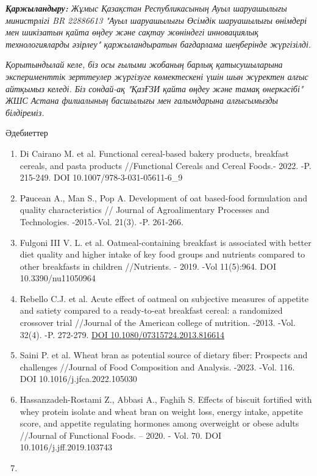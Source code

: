 \emph{{\bfseries Қаржыландыру:} Жұмыс Қазақстан Республикасының Ауыл
шаруашылығы министрлігі BR 22886613 "Ауыл шаруашылығы Өсімдік
шаруашылығы өнімдері мен шикізатын қайта өңдеу және сақтау жөніндегі
инновациялық технологияларды әзірлеу" қаржыландыратын бағдарлама
шеңберінде жүргізілді.}

\emph{Қорытындылай келе, біз осы ғылыми жобаның барлық қатысушыларына
эксперименттік зерттеулер жүргізуге көмектескені үшін шын жүректен алғыс
айтқымыз келеді. Біз сондай-ақ "ҚазҒЗИ қайта өңдеу және тамақ
өнеркәсібі" ЖШС Астана филиалының басшылығы мен ғалымдарына алғысымызды
білдіреміз.}

Әдебиеттер

\begin{enumerate}
\def\labelenumi{\arabic{enumi}.}
\item
  Di Cairano M. et al. Functional cereal-based bakery products,
  breakfast cereals, and pasta products //Functional Cereals and Cereal
  Foods.- 2022. -P. 215-249. DOI 10.1007/978-3-031-05611-6\_9
\item
  Pаucean A., Man S., Pop A. Development of oat based-food formulation
  and quality characteristics // Journal of Agroalimentary Processes and
  Technologies. -2015.-Vol. 21(3). -P. 261-266.
\item
  Fulgoni III V. L. et al. Oatmeal-containing breakfast is associated
  with better diet quality and higher intake of key food groups and
  nutrients compared to other breakfasts in children //Nutrients. -
  2019. -Vol 11(5):964. DOI 10.3390/nu11050964
\item
  Rebello C.J. et al. Acute effect of oatmeal on subjective measures of
  appetite and satiety compared to a ready-to-eat breakfast cereal: a
  randomized crossover trial //Journal of the American college of
  nutrition. -2013. -Vol. 32(4). -P. 272-279.
  \href{https://doi.org/10.1080/07315724.2013.816614}{DOI
  10.1080/07315724.2013.816614}
\item
  Saini P. et al. Wheat bran as potential source of dietary fiber:
  Prospects and challenges //Journal of Food Composition and Analysis.
  -2023. -Vol. 116. DOI 10.1016/j.jfca.2022.105030
\item
  Hassanzadeh-Rostami Z., Abbasi A., Faghih S. Effects of biscuit
  fortified with whey protein isolate and wheat bran on weight loss,
  energy intake, appetite score, and appetite regulating hormones among
  overweight or obese adults //Journal of Functional Foods. -- 2020. -
  Vol. 70. DOI 10.1016/j.jff.2019.103743
\item

\end{enumerate}
